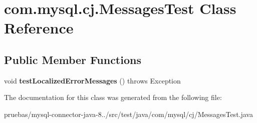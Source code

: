 \hypertarget{classcom_1_1mysql_1_1cj_1_1_messages_test}{}\section{com.\+mysql.\+cj.\+Messages\+Test Class Reference}
\label{classcom_1_1mysql_1_1cj_1_1_messages_test}
\subsection*{Public Member Functions}
\begin{DoxyCompactItemize}
\item 
\mbox{\label{classcom_1_1mysql_1_1cj_1_1_messages_test_a36983c9f9c1b4bff069158e80769983f}} 
void {\bfseries test\+Localized\+Error\+Messages} ()  throws Exception 
\end{DoxyCompactItemize}


The documentation for this class was generated from the following file\+:\begin{DoxyCompactItemize}
\item 
pruebas/mysql-\/connector-\/java-\/8../src/test/java/com/mysql/cj/Messages\+Test.\+java\end{DoxyCompactItemize}
